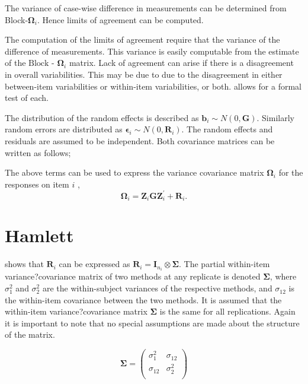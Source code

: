 \documentclass[12pt, a4paper]{report}
\theoremstyle{plain}
\theoremstyle{definition}
\theoremstyle{remark}
\begin{document}
The variance of case-wise difference in measurements can be determined from Block-$\boldsymbol{\Omega}_{i}$. Hence limits of agreement can be computed.


The computation of the limits of agreement require that the variance of the difference of measurements. This variance is easily computable from the estimate of the ${\mbox{Block - }\boldsymbol \Omega_{i}}$ matrix. Lack of agreement can arise if there is a disagreement in overall variabilities. This may be due to due to the disagreement in either between-item
variabilities or within-item variabilities, or both. \citet{ARoy2009} allows for a formal test of each.


The distribution of the random effects is described as $\boldsymbol{b}_i \sim N(0,\boldsymbol{G})$. Similarly  random errors are distributed as $\boldsymbol{\epsilon}_i \sim N(0,\boldsymbol{R}_i)$. The random effects and residuals are assumed to be independent. Both covariance matrices can be written as follows;


\bigskip
The above terms can be used to express the  variance covariance matrix $\boldsymbol{\Omega}_i$ for the responses on item $i$ ,
\[
\boldsymbol{\Omega}_i = \boldsymbol{Z}_i \boldsymbol{G} \boldsymbol{Z}_i^{\prime} + \boldsymbol{R}_i.
\]

\section{Hamlett}
\citet{hamlett} shows that $\boldsymbol{R}_{i}$  can be expressed as $\boldsymbol{R}_{i} = \boldsymbol{I}_{n_{i}} \otimes \boldsymbol{\Sigma}$. The partial within-item variance?covariance matrix of two methods at any replicate is denoted $\boldsymbol{\Sigma}$, where $\sigma^2_{1}$ and $\sigma^2_{2}$ are the within-subject variances of the respective methods, and $\sigma_{12}$ is the within-item covariance between the two methods. It is assumed that the within-item variance?covariance matrix $\boldsymbol{\Sigma}$ is the same for all replications. Again it is important to note that no special assumptions are made about the structure of the matrix.

\begin{equation}
\boldsymbol{\Sigma} = \left( \begin{array}{cc}
\sigma^2_{1} & \sigma_{12} \\
\sigma_{12} & \sigma^2_{2} \\
\end{array}\right)
\end{equation}
\end{document}
